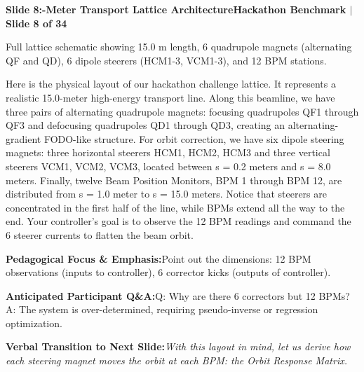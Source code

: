 \documentclass[11pt,a4paper]{article}
\begin{document}
\clearpage
\hypertarget{slide.8}{}
{}
\noindent\begin{tcolorbox}[colback=navy,colframe=navy,left=6pt,right=6pt,top=3pt,bottom=3pt,boxrule=0pt,arc=2pt]
{\large\bfseries\color{white}Slide 8:-Meter Transport Lattice Architecture}\hfill{\footnotesize\bfseries\color{white!85!lightbg}Hackathon Benchmark \enspace$|$\enspace Slide 8 of 34}
\end{tcolorbox}
\vspace{0.2em}
\begin{tcolorbox}[colback=lightbg,colframe=bordergray,title={\footnotesize\bfseries\color{darkgray}Slide Visual Blueprint},fontupper=\small,left=6pt,right=6pt,top=2.5pt,bottom=2.5pt,boxrule=0.6pt,arc=2.5pt]
Full lattice schematic showing 15.0 m length, 6 quadrupole magnets (alternating QF and QD), 6 dipole steerers (HCM1-3, VCM1-3), and 12 BPM stations.
\end{tcolorbox}
\vspace{0.2em}
\begin{tcolorbox}[colback=white,colframe=primaryblue,title={\footnotesize\bfseries\color{white}Spoken Presenter Script},fontupper=\small,left=6pt,right=6pt,top=3pt,bottom=3pt,boxrule=0.8pt,arc=2.5pt]
Here is the physical layout of our hackathon challenge lattice. It represents a realistic 15.0-meter high-energy transport line. Along this beamline, we have three pairs of alternating quadrupole magnets: focusing quadrupoles QF1 through QF3 and defocusing quadrupoles QD1 through QD3, creating an alternating-gradient FODO-like structure. For orbit correction, we have six dipole steering magnets: three horizontal steerers HCM1, HCM2, HCM3 and three vertical steerers VCM1, VCM2, VCM3, located between s = 0.2 meters and s = 8.0 meters. Finally, twelve Beam Position Monitors, BPM 1 through BPM 12, are distributed from s = 1.0 meter to s = 15.0 meters. Notice that steerers are concentrated in the first half of the line, while BPMs extend all the way to the end. Your controller's goal is to observe the 12 BPM readings and command the 6 steerer currents to flatten the beam orbit.
\end{tcolorbox}
\vspace{0.2em}
\begin{tcolorbox}[colback=lightbg,colframe=bordergray,left=6pt,right=6pt,top=3pt,bottom=3pt,boxrule=0.6pt,arc=2.5pt]
\small
\noindent\textbf{\color{navy}Pedagogical Focus \& Emphasis:}\enspace Point out the dimensions: 12 BPM observations (inputs to controller), 6 corrector kicks (outputs of controller).\par\vspace{0.3em}
\noindent\textbf{\color{successgreen}Anticipated Participant Q\&A:}\enspace Q: Why are there 6 correctors but 12 BPMs? A: The system is over-determined, requiring pseudo-inverse or regression optimization.\par\vspace{0.3em}
\noindent\textbf{\color{accent}Verbal Transition to Next Slide:}\enspace \emph{With this layout in mind, let us derive how each steering magnet moves the orbit at each BPM: the Orbit Response Matrix.}
\end{tcolorbox}
\end{document}
